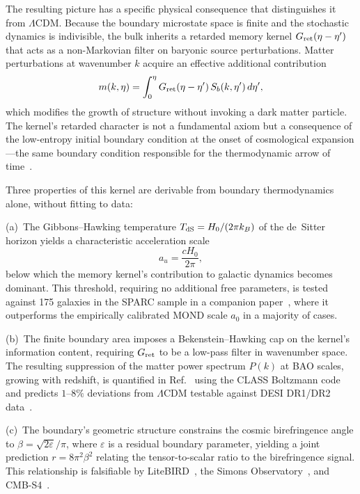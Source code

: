 \documentclass[aps,prd,twocolumn,superscriptaddress,nofootinbib]{revtex4-2}
\begin{document}
The resulting picture has a specific physical consequence that distinguishes it from $\Lambda$CDM. Because the boundary microstate space is finite and the stochastic dynamics is indivisible, the bulk inherits a retarded memory kernel $G_{\rm ret}(\eta - \eta')$ that acts as a non-Markovian filter on baryonic source perturbations. Matter perturbations at wavenumber $k$ acquire an effective additional contribution
\begin{equation}
m(k,\eta) = \int_0^{\eta} G_{\rm ret}(\eta - \eta')\, S_b(k,\eta')\, d\eta',
\label{eq:memory}
\end{equation}
which modifies the growth of structure without invoking a dark matter particle. The kernel's retarded character is not a fundamental axiom but a consequence of the low-entropy initial boundary condition at the onset of cosmological expansion---the same boundary condition responsible for the thermodynamic arrow of time~\cite{Penrose1979,Carroll2010}.

Three properties of this kernel are derivable from boundary thermodynamics alone, without fitting to data:

(a)~The Gibbons--Hawking temperature $T_{\rm dS} = H_0/(2\pi k_B)$ of the de~Sitter horizon yields a characteristic acceleration scale
\begin{equation}
a_u = \frac{cH_0}{2\pi},
\label{eq:au}
\end{equation}
below which the memory kernel's contribution to galactic dynamics becomes dominant. This threshold, requiring no additional free parameters, is tested against 175 galaxies in the SPARC sample in a companion paper~\cite{PaperI}, where it outperforms the empirically calibrated MOND scale $a_0$ in a majority of cases.

(b)~The finite boundary area imposes a Bekenstein--Hawking cap on the kernel's information content, requiring $G_{\rm ret}$ to be a low-pass filter in wavenumber space. The resulting suppression of the matter power spectrum $P(k)$ at BAO scales, growing with redshift, is quantified in Ref.~\cite{PaperVIII} using the CLASS Boltzmann code~\cite{CLASS2011} and predicts $1$--$8\%$ deviations from $\Lambda$CDM testable against DESI DR1/DR2 data~\cite{DESI2024}.

(c)~The boundary's geometric structure constrains the cosmic birefringence angle to $\beta = \sqrt{2\varepsilon}/\pi$, where $\varepsilon$ is a residual boundary parameter, yielding a joint prediction $r = 8\pi^2\beta^2$ relating the tensor-to-scalar ratio to the birefringence signal. This relationship is falsifiable by LiteBIRD~\cite{LiteBIRD2023}, the Simons Observatory~\cite{SimonsObs2019}, and CMB-S4~\cite{CMBS42016}.
\end{document}
